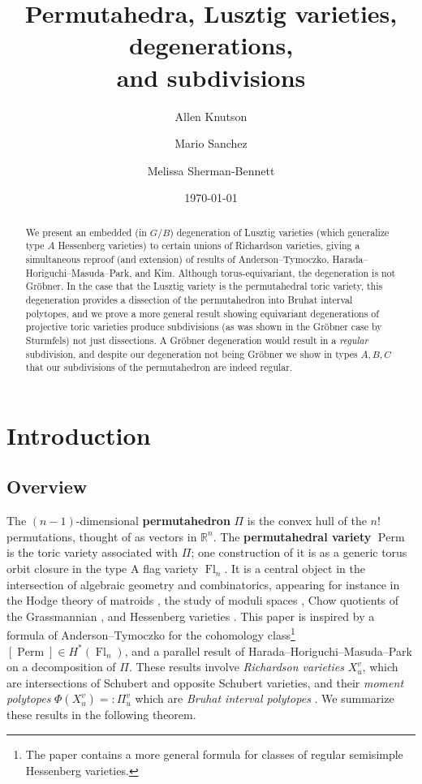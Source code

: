 \documentclass[11pt]{amsart}
\title
[Permutahedra, Lusztig varieties, degenerations, and subdivisions]
{Permutahedra, Lusztig varieties, degenerations, \\ and subdivisions}
\author{Allen Knutson}
\author{Mario Sanchez}
\author{Melissa Sherman-Bennett}
\date{\today}
\theoremstyle{definition}
\newcommand{\AK}[1]{\textcolor{darkgreen}{[AK: #1]}}
\DeclareMathOperator{\Perm}{Perm}
\DeclareMathOperator{\Fl}{Fl}
\newcommand{\RR}{\mathbb{R}}
\newcommand\defn[1]{{\bf #1}}
\begin{document}
\begin{abstract}
  We present an embedded (in $G/B$) degeneration of Lusztig varieties
  (which generalize type $A$ Hessenberg varieties) to certain unions of
  Richardson varieties, giving a simultaneous reproof (and extension)
  of results of Anderson--Tymoczko, Harada--Horiguchi--Masuda--Park, and Kim.
  Although torus-equivariant, the degeneration is not Gr\"obner. 
  In the case that the Lusztig variety is the permutahedral toric variety,
  this degeneration provides a dissection of the permutahedron into
  Bruhat interval polytopes, and we prove a more general result showing
  equivariant degenerations of projective toric varieties produce subdivisions
  (as was shown in the Gr\"obner case by Sturmfels) not just dissections.
  A Gr\"obner degeneration would result in a {\em regular} subdivision,
  and despite our degeneration not being Gr\"obner we show in types $A,B,C$
  that our subdivisions of the permutahedron are indeed regular.
\end{abstract}
\maketitle
\setcounter{tocdepth}{2}
	\tableofcontents




\section{Introduction}

\subsection{Overview}

The $(n-1)$-dimensional \defn{permutahedron} $\Pi$ is the convex hull of the
$n!$ permutations, thought of as vectors in $\RR^n$.
The \defn{permutahedral variety} $\Perm$ is the toric variety associated with
$\Pi$; one construction of it is as a generic torus orbit
closure in the type A flag variety $\Fl_n$. 
It is a central object in the
intersection of algebraic geometry and combinatorics, appearing for
instance in the Hodge theory of matroids \cite{huh2014rota}, the study
of moduli spaces \cite{losev2000new},
Chow quotients of the Grassmannian \cite[4.3.10]{kapranov1992chow},
and Hessenberg varieties \cite{lin2024geometry}. 
This paper is inspired by a formula of Anderson--Tymoczko \cite{AT10}
for the cohomology class\footnote{The paper \cite{AT10} contains a more
  general formula for classes of regular semisimple Hessenberg
  varieties.} $[\Perm] \in H^*(\Fl_n)$, and a parallel result of
Harada--Horiguchi--Masuda--Park \cite{HHMP19} on a decomposition of 
$\Pi$. These results involve \emph{Richardson
  varieties} $X_u^v$, which are intersections of Schubert and opposite
Schubert varieties, and their {\em moment polytopes} $\Phi(X_u^v) =: \Pi_u^v$
which are \emph{Bruhat interval polytopes} \cite{KW15}. We summarize
these results in the following theorem.
 
\end{document}
